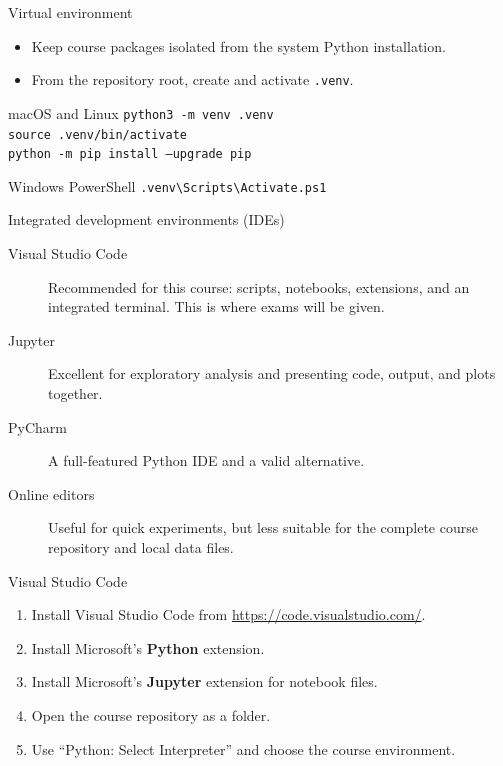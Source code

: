 \documentclass[aspectratio=169,11pt]{beamer}
\begin{document}
\begin{frame}{Virtual environment}
  \begin{itemize}
    \item Keep course packages isolated from the system Python installation.
    \item From the repository root, create and activate \texttt{.venv}.
  \end{itemize}
  \begin{block}{macOS and Linux}
    \texttt{python3 -m venv .venv}\\
    \texttt{source .venv/bin/activate}\\
    \texttt{python -m pip install --upgrade pip}
  \end{block}
  \begin{block}{Windows PowerShell}
    \texttt{.venv\textbackslash Scripts\textbackslash Activate.ps1}
  \end{block}
\end{frame}

\begin{frame}{Integrated development environments (IDEs)}
  \begin{description}
    \item[Visual Studio Code] Recommended for this course: scripts, notebooks,
          extensions, and an integrated terminal. This is where exams will be given.
    \item[Jupyter] Excellent for exploratory analysis and presenting code,
          output, and plots together.
    \item[PyCharm] A full-featured Python IDE and a valid alternative.
    \item[Online editors] Useful for quick experiments, but less suitable for
          the complete course repository and local data files.
  \end{description}
\end{frame}

\begin{frame}{Visual Studio Code}
  \begin{enumerate}
    \item Install Visual Studio Code from \url{https://code.visualstudio.com/}.
    \item Install Microsoft's \textbf{Python} extension.
    \item Install Microsoft's \textbf{Jupyter} extension for notebook files.
    \item Open the course repository as a folder.
    \item Use ``Python: Select Interpreter'' and choose the course environment.
  \end{enumerate}
\end{frame}
\end{document}
